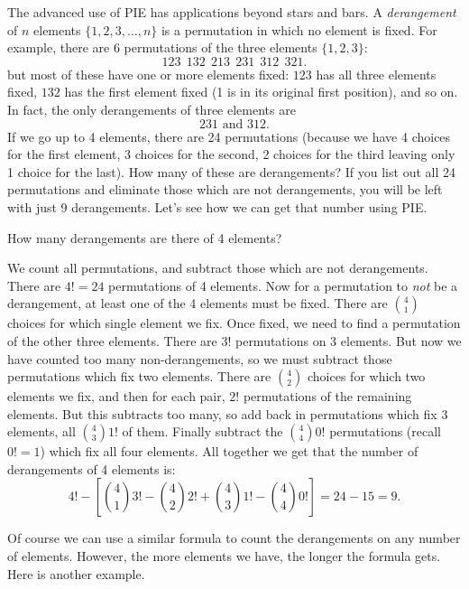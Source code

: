 \documentclass[12pt]{article}
\begin{document}
The advanced use of PIE has applications beyond stars and bars.  A {\em derangement} of $n$ elements $\{1,2,3,\ldots, n\}$ is a permutation in which no element is fixed.  For example, there are $6$ permutations of the three elements $\{1,2,3\}$:
\[123 ~~ 132 ~~ 213 ~~ 231 ~~ 312 ~~ 321.\]
but most of these have one or more elements fixed: $123$ has all three elements fixed, $132$ has the first element fixed (1 is in its original first position), and so on.  In fact, the only derangements of three elements are
\[231 \mbox{  and  }312.\]
If we go up to 4 elements, there are 24 permutations (because we have 4 choices for the first element, 3 choices for the second, 2 choices for the third leaving only 1 choice for the last).  How many of these are derangements?  If you list out all 24 permutations and eliminate those which are not derangements, you will be left with just 9 derangements.  Let's see how we can get that number using PIE.

\begin{example}
  How many derangements are there of 4 elements?
  \begin{solution}
    We count all permutations, and subtract those which are not derangements.  There are $4! = 24$ permutations of 4 elements.  Now for a permutation to {\em not} be a derangement, at least one of the 4 elements must be fixed.  There are ${4 \choose 1}$ choices for which single element we fix.  Once fixed, we need to find a permutation of the other three elements. There are $3!$ permutations on 3 elements.  But now we have counted too many non-derangements, so we must subtract those permutations which fix two elements.  There are ${4 \choose 2}$ choices for which two elements we fix, and then for each pair, $2!$ permutations of the remaining elements.  But this subtracts too many, so add back in permutations which fix 3 elements, all ${4 \choose 3}1!$ of them.  Finally subtract the ${4 \choose 4}0!$ permutations (recall $0! = 1$) which fix all four elements.  All together we get that the number of derangements of 4 elements is:
    \[4! - \left[{4 \choose 1}3! - {4 \choose 2}2! + {4 \choose 3} 1! - {4 \choose 4}0!\right] = 24 - 15 = 9.\]
    
  \end{solution}

\end{example}

Of course we can use a similar formula to count the derangements on any number of elements.  However, the more elements we have, the longer the formula gets.  Here is another example.
\end{document}
